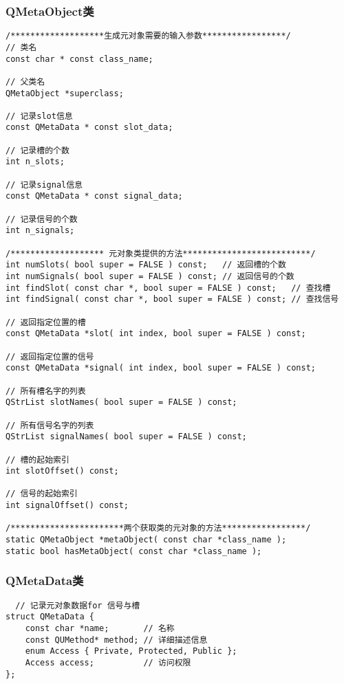 \documentclass[9pt,b5paper]{article}
\begin{document}
\subsubsection{QMetaObject类}
\label{sec-4-1-1}
\lstset{language=java,label= ,caption= ,numbers=none}
\begin{lstlisting}
/*******************生成元对象需要的输入参数*****************/  
// 类名  
const char * const class_name;  

// 父类名  
QMetaObject *superclass;  

// 记录slot信息  
const QMetaData * const slot_data;   

// 记录槽的个数  
int n_slots;  

// 记录signal信息  
const QMetaData * const signal_data;  

// 记录信号的个数  
int n_signals;

/******************* 元对象类提供的方法**************************/  
int numSlots( bool super = FALSE ) const;   // 返回槽的个数  
int numSignals( bool super = FALSE ) const; // 返回信号的个数  
int findSlot( const char *, bool super = FALSE ) const;   // 查找槽  
int findSignal( const char *, bool super = FALSE ) const; // 查找信号  

// 返回指定位置的槽  
const QMetaData *slot( int index, bool super = FALSE ) const;  

// 返回指定位置的信号  
const QMetaData *signal( int index, bool super = FALSE ) const;  

// 所有槽名字的列表  
QStrList slotNames( bool super = FALSE ) const;  

// 所有信号名字的列表  
QStrList signalNames( bool super = FALSE ) const;  

// 槽的起始索引  
int slotOffset() const;  

// 信号的起始索引  
int signalOffset() const;  

/***********************两个获取类的元对象的方法*****************/  
static QMetaObject *metaObject( const char *class_name );  
static bool hasMetaObject( const char *class_name );
\end{lstlisting}
\subsubsection{QMetaData类}
\label{sec-4-1-2}
\lstset{language=java,label= ,caption= ,numbers=none}
\begin{lstlisting}
  // 记录元对象数据for 信号与槽  
struct QMetaData {                                   
    const char *name;       // 名称  
    const QUMethod* method; // 详细描述信息  
    enum Access { Private, Protected, Public };  
    Access access;          // 访问权限  
};
\end{lstlisting}
\end{document}

